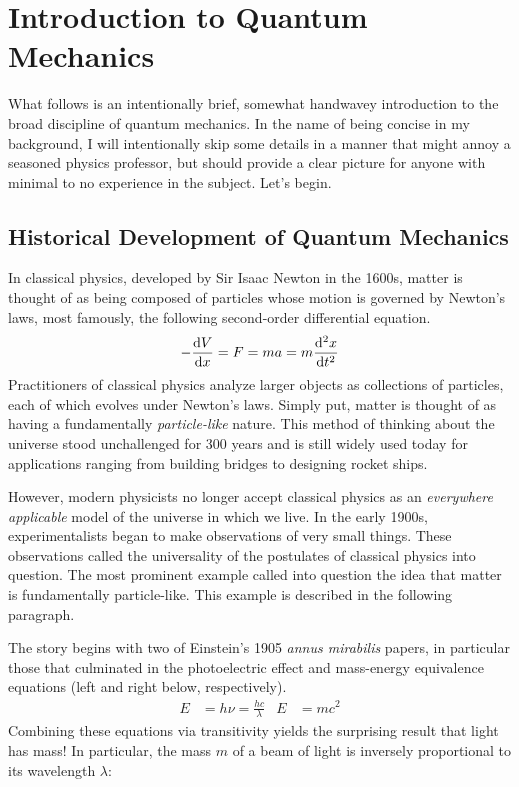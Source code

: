 \documentclass[titlepage]{article}
\numberwithin{equation}{section}
\begin{document}
\section{Introduction to Quantum Mechanics}\label{sse:qmech}
What follows is an intentionally brief, somewhat handwavey introduction to the broad discipline of quantum mechanics. In the name of being concise in my background, I will intentionally skip some details in a manner that might annoy a seasoned physics professor, but should provide a clear picture for anyone with minimal to no experience in the subject. Let's begin.


\subsection{Historical Development of Quantum Mechanics}
In classical physics, developed by Sir Isaac Newton in the 1600s, matter is thought of as being composed of particles whose motion is governed by Newton's laws, most famously, the following second-order differential equation.
\begin{equation}\label{eqn:Newton2nd}
    -\dv{V}{x} = F 
    = ma
    = m\dv[2]{x}{t}
\end{equation}
Practitioners of classical physics analyze larger objects as collections of particles, each of which evolves under Newton's laws. Simply put, matter is thought of as having a fundamentally \emph{particle-like} nature. This method of thinking about the universe stood unchallenged for 300 years and is still widely used today for applications ranging from building bridges to designing rocket ships.\par
However, modern physicists no longer accept classical physics as an \emph{everywhere applicable} model of the universe in which we live. In the early 1900s, experimentalists began to make observations of very small things. These observations called the universality of the postulates of classical physics into question. The most prominent example called into question the idea that matter is fundamentally particle-like. This example is described in the following paragraph.\par
The story begins with two of Einstein's 1905 \emph{annus mirabilis} papers, in particular those that culminated in the photoelectric effect and mass-energy equivalence equations (left and right below, respectively).
\begin{align*}
    E &= h\nu = \frac{hc}{\lambda}&
    E &= mc^2
\end{align*}
Combining these equations via transitivity yields the surprising result that light has mass! In particular, the mass $m$ of a beam of light is inversely proportional to its wavelength $\lambda$:
\end{document}
